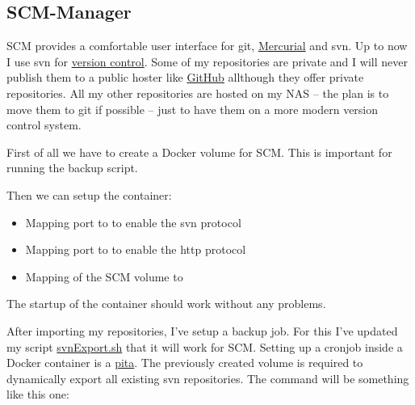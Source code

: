 \subsection{SCM-Manager}

\gls{SCM} provides a comfortable user interface for \gls{git},
\href{https://www.mercurial-scm.org}{Mercurial} and \gls{svn}. Up to now I use
\gls{svn} for \href{https://en.wikipedia.org/wiki/Version_control}{version control}.
Some of my repositories are private and I will never publish them to a public
hoster like \href{https://github.com}{GitHub} allthough they offer private
repositories. All my other repositories are hosted on my \gls{NAS} -- the plan
is to move them to \gls{git} if possible -- just to have them on a more modern
version control system.
\bigbreak

First of all we have to create a \gls{Docker} volume for \gls{SCM}. This is
important for running the backup script.


Then we can setup the container:

\begin{itemize}
    \item Mapping port  to  to enable the \gls{svn} protocol
    \item Mapping port  to  to enable the http protocol
    \item Mapping of the \gls{SCM} volume to 
\end{itemize}



The startup of the container should work without any problems.


After importing my repositories, I've setup a backup job. For this I've updated
my script \href{https://github.com/ThirtySomething/NAS}{svnExport.sh} that it
will work for \gls{SCM}. Setting up a cronjob inside a \gls{Docker} container
is a \href{https://en.wiktionary.org/wiki/pain_in_the_ass}{pita}. The previously
created volume is required to dynamically export all existing \gls{svn}
repositories. The command will be something like this one:

